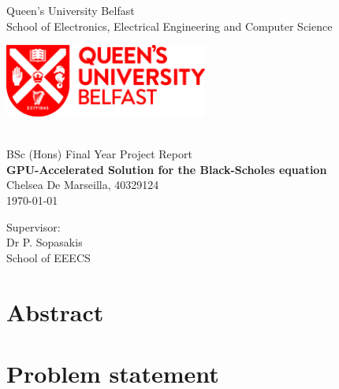 \documentclass[a4paper,12pt]{report}
\begin{document}
    \begin{titlepage}
    \thispagestyle{empty}
    \begin{center}
        {Queen's University Belfast}\\[0.4cm]
        {School of Electronics, Electrical Engineering and Computer Science}\\[1cm]
        \hbox{}\hfill
        \begin{minipage}[t]{\textwidth}
        \begin{center}
            \includegraphics[width=0.5\textwidth]{figures/logo.jpg}
        \end{center}
        \end{minipage}
        \hfill\hbox{}
        \\[3cm]
        {\large BSc (Hons) Final Year Project Report\\[0.3cm]}
        {\LARGE \bfseries \biolinum GPU-Accelerated Solution for the Black-Scholes equation \\[3cm]}
        {\large Chelsea De Marseilla, 40329124}\\[0.4cm]
        {\large \today}
    \end{center}
    \vspace*{\fill}
    \begin{minipage}[t]{0.48\textwidth}
        {Supervisor:}\\[0.3cm]
        {\large Dr P. Sopasakis}\\[0.1cm]
        School of EEECS
    \end{minipage}
    \hfill
\end{titlepage}


\clearpage
\setcounter{page}{0}

\newpage
{}
\chapter*{Abstract}


\pagebreak
\tableofcontents
\pagebreak




\chapter{Problem statement}
\end{document}
